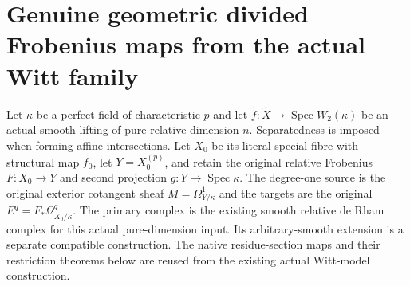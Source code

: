 \section{Genuine geometric divided Frobenius maps from the actual Witt family}

Let $\kappa$ be a perfect field of characteristic $p$ and let $\widetilde f:\widetilde X\to\operatorname{Spec}W_2(\kappa)$ be an actual smooth lifting of pure relative dimension $n$. Separatedness is imposed when forming affine intersections. Let $X_0$ be its literal special fibre with structural map $f_0$, let $Y=X_0^{(p)}$, and retain the original relative Frobenius $F:X_0\to Y$ and second projection $g:Y\to\operatorname{Spec}\kappa$. The degree-one source is the original exterior cotangent sheaf $M=\Omega^1_{Y/\kappa}$ and the targets are the original $E^q=F_*\Omega^q_{X_0/\kappa}$. The primary complex is the existing smooth relative de Rham complex for this actual pure-dimension input. Its arbitrary-smooth extension is a separate compatible construction. The native residue-section maps and their restriction theorems below are reused from the existing actual Witt-model construction.

